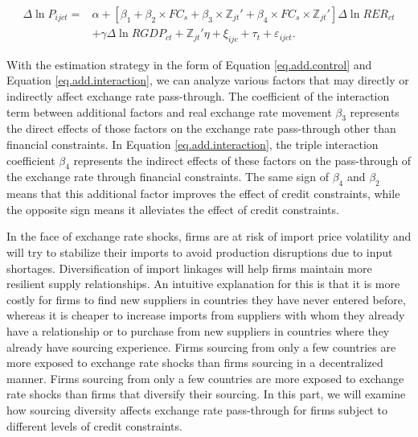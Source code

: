 \begin{equation}
    \begin{aligned}
    \Delta \ln P_{ijct}=&\alpha+[\beta_{1}+ \beta_{2} \times FC_{s}+\beta_{3} \times {\mathbb{Z}_{jt}}'+\beta_{4} \times FC_{s} \times {\mathbb{Z}_{jt}}'] \Delta \ln RER_{ct} \\ &+\gamma \Delta \ln RGDP_{ct}+ {\mathbb{Z}_{jt}}' \eta+\xi_{ijc}+\tau_{t} +\varepsilon_{ijct}.
    \end{aligned}	
    \label{eq.add.interaction}
\end{equation}

With the estimation strategy in the form of Equation \ref{eq.add.control} and Equation \ref{eq.add.interaction}, we can analyze various factors that may directly or indirectly affect exchange rate pass-through. The coefficient of the interaction term between additional factors and real exchange rate movement $\beta_3$ represents the direct effects of those factors on the exchange rate pass-through other than financial constraints. In Equation \ref{eq.add.interaction}, the triple interaction coefficient $\beta_4$ represents the indirect effects of these factors on the pass-through of the exchange rate through financial constraints. The same sign of $\beta_4$ and $\beta_2$ means that this additional factor improves the effect of credit constraints, while the opposite sign means it alleviates the effect of credit constraints.

In the face of exchange rate shocks, firms are at risk of import price volatility and will try to stabilize their imports to avoid production disruptions due to input shortages. Diversification of import linkages will help firms maintain more resilient supply relationships. An intuitive explanation for this is that it is more costly for firms to find new suppliers in countries they have never entered before, whereas it is cheaper to increase imports from suppliers with whom they already have a relationship or to purchase from new suppliers in countries where they already have sourcing experience. Firms sourcing from only a few countries are more exposed to exchange rate shocks than firms sourcing in a decentralized manner.
Firms sourcing from only a few countries are more exposed to exchange rate shocks than firms that diversify their sourcing. In this part, we will examine how sourcing diversity affects exchange rate pass-through for firms subject to different levels of credit constraints.

